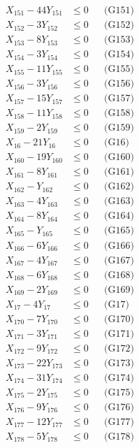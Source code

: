 \documentclass[a4paper,10pt]{article}
\begin{document}
{\begin{align}
X_{151} - 44Y_{151} &\leq 0 && \text{(G151)} \\
\allowbreak
X_{152} - 3Y_{152} &\leq 0 && \text{(G152)} \\
X_{153} - 8Y_{153} &\leq 0 && \text{(G153)} \\
X_{154} - 3Y_{154} &\leq 0 && \text{(G154)} \\
X_{155} - 11Y_{155} &\leq 0 && \text{(G155)} \\
X_{156} - 3Y_{156} &\leq 0 && \text{(G156)} \\
X_{157} - 15Y_{157} &\leq 0 && \text{(G157)} \\
X_{158} - 11Y_{158} &\leq 0 && \text{(G158)} \\
X_{159} - 2Y_{159} &\leq 0 && \text{(G159)} \\
X_{16} - 21Y_{16} &\leq 0 && \text{(G16)} \\
X_{160} - 19Y_{160} &\leq 0 && \text{(G160)} \\
X_{161} - 8Y_{161} &\leq 0 && \text{(G161)} \\
X_{162} - Y_{162} &\leq 0 && \text{(G162)} \\
X_{163} - 4Y_{163} &\leq 0 && \text{(G163)} \\
X_{164} - 8Y_{164} &\leq 0 && \text{(G164)} \\
X_{165} - Y_{165} &\leq 0 && \text{(G165)} \\
X_{166} - 6Y_{166} &\leq 0 && \text{(G166)} \\
X_{167} - 4Y_{167} &\leq 0 && \text{(G167)} \\
X_{168} - 6Y_{168} &\leq 0 && \text{(G168)} \\
X_{169} - 2Y_{169} &\leq 0 && \text{(G169)} \\
X_{17} - 4Y_{17} &\leq 0 && \text{(G17)} \\
\allowbreak
X_{170} - 7Y_{170} &\leq 0 && \text{(G170)} \\
X_{171} - 3Y_{171} &\leq 0 && \text{(G171)} \\
X_{172} - 9Y_{172} &\leq 0 && \text{(G172)} \\
X_{173} - 22Y_{173} &\leq 0 && \text{(G173)} \\
X_{174} - 31Y_{174} &\leq 0 && \text{(G174)} \\
X_{175} - 2Y_{175} &\leq 0 && \text{(G175)} \\
X_{176} - 9Y_{176} &\leq 0 && \text{(G176)} \\
X_{177} - 12Y_{177} &\leq 0 && \text{(G177)} \\
X_{178} - 5Y_{178} &\leq 0 && \text{(G178)} \\

\end{align}}
\end{document}
